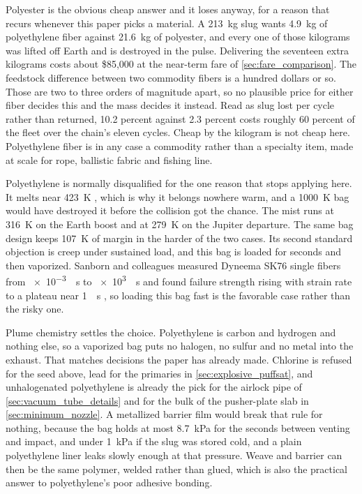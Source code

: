 \documentclass{article}
\begin{document}
Polyester is the obvious cheap answer and it loses anyway, for a reason that recurs whenever this paper picks a material. A \SI{213}{\kilogram} slug wants \SI{4.9}{\kilogram} of polyethylene fiber against \SI{21.6}{\kilogram} of polyester, and every one of those kilograms was lifted off Earth and is destroyed in the pulse. Delivering the seventeen extra kilograms costs about \$85{,}000 at the near-term fare of \autoref{sec:fare_comparison}. The feedstock difference between two commodity fibers is a hundred dollars or so. Those are two to three orders of magnitude apart, so no plausible price for either fiber decides this and the mass decides it instead. Read as slug lost per cycle rather than returned, 10.2 percent against 2.3 percent costs roughly 60 percent of the fleet over the chain's eleven cycles. Cheap by the kilogram is not cheap here. Polyethylene fiber is in any case a commodity rather than a specialty item, made at scale for rope, ballistic fabric and fishing line.

Polyethylene is normally disqualified for the one reason that stops applying here. It melts near \SI{423}{\kelvin} \cite{toyobo_zylon}, which is why it belongs nowhere warm, and a \SI{1000}{\kelvin} bag would have destroyed it before the collision got the chance. The mist runs at \SI{316}{\kelvin} on the Earth boost and at \SI{279}{\kelvin} on the Jupiter departure. The same bag design keeps \SI{107}{\kelvin} of margin in the harder of the two cases. Its second standard objection is creep under sustained load, and this bag is loaded for seconds and then vaporized. Sanborn and colleagues measured Dyneema SK76 single fibers from \SI{e-3}{\per\second} to \SI{e3}{\per\second} and found failure strength rising with strain rate to a plateau near \SI{1}{\per\second} \cite{sanborn2014dyneema}, so loading this bag fast is the favorable case rather than the risky one.

Plume chemistry settles the choice. Polyethylene is carbon and hydrogen and nothing else, so a vaporized bag puts no halogen, no sulfur and no metal into the exhaust. That matches decisions the paper has already made. Chlorine is refused for the seed above, lead for the primaries in \autoref{sec:explosive_puffsat}, and unhalogenated polyethylene is already the pick for the airlock pipe of \autoref{sec:vacuum_tube_details} and for the bulk of the pusher-plate slab in \autoref{sec:minimum_nozzle}. A metallized barrier film would break that rule for nothing, because the bag holds at most \SI{8.7}{\kilo\pascal} for the seconds between venting and impact, and under \SI{1}{\kilo\pascal} if the slug was stored cold, and a plain polyethylene liner leaks slowly enough at that pressure. Weave and barrier can then be the same polymer, welded rather than glued, which is also the practical answer to polyethylene's poor adhesive bonding.
\end{document}
